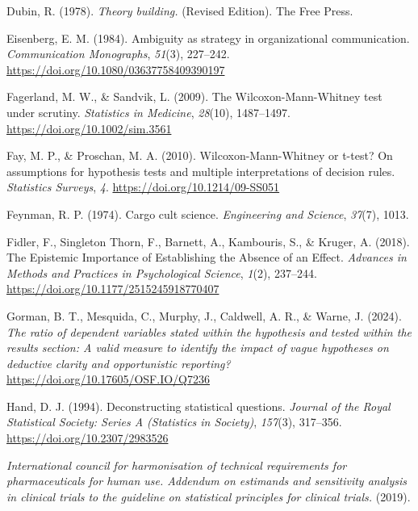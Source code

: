 \documentclass[
]{article}
\newlength{\cslhangindent}
\newenvironment{CSLReferences}[2] %
 {\begin{list}{}{%
  \setlength{\itemindent}{0pt}
  \setlength{\leftmargin}{0pt}
  \setlength{\parsep}{0pt}
  \ifodd #1
   \setlength{\leftmargin}{\cslhangindent}
   \setlength{\itemindent}{-1\cslhangindent}
  \fi
  \setlength{\itemsep}{#2\baselineskip}}}
 {\end{list}}
\begin{document}
\begin{CSLReferences}{1}{0}
Dubin, R. (1978). \emph{Theory building.} (Revised Edition). The Free
Press.

Eisenberg, E. M. (1984). Ambiguity as strategy in organizational
communication. \emph{Communication Monographs}, \emph{51}(3), 227--242.
\url{https://doi.org/10.1080/03637758409390197}

Fagerland, M. W., \& Sandvik, L. (2009). The {Wilcoxon}-{Mann}-{Whitney}
test under scrutiny. \emph{Statistics in Medicine}, \emph{28}(10),
1487--1497. \url{https://doi.org/10.1002/sim.3561}

Fay, M. P., \& Proschan, M. A. (2010). Wilcoxon-{Mann}-{Whitney} or
t-test? {On} assumptions for hypothesis tests and multiple
interpretations of decision rules. \emph{Statistics Surveys}, \emph{4}.
\url{https://doi.org/10.1214/09-SS051}

Feynman, R. P. (1974). Cargo cult science. \emph{Engineering and
Science}, \emph{37}(7), 1013.

Fidler, F., Singleton Thorn, F., Barnett, A., Kambouris, S., \& Kruger,
A. (2018). The {Epistemic} {Importance} of {Establishing} the {Absence}
of an {Effect}. \emph{Advances in Methods and Practices in Psychological
Science}, \emph{1}(2), 237--244.
\url{https://doi.org/10.1177/2515245918770407}

Gorman, B. T., Mesquida, C., Murphy, J., Caldwell, A. R., \& Warne, J.
(2024). \emph{The ratio of dependent variables stated within the
hypothesis and tested within the results section: A valid measure to
identify the impact of vague hypotheses on deductive clarity and
opportunistic reporting?} \url{https://doi.org/10.17605/OSF.IO/Q7236}

Hand, D. J. (1994). Deconstructing statistical questions. \emph{Journal
of the Royal Statistical Society: Series A (Statistics in Society)},
\emph{157}(3), 317--356. \url{https://doi.org/10.2307/2983526}

\emph{International council for harmonisation of technical requirements
for pharmaceuticals for human use. Addendum on estimands and sensitivity
analysis in clinical trials to the guideline on statistical principles
for clinical trials.} (2019).


\end{CSLReferences}
\end{document}
